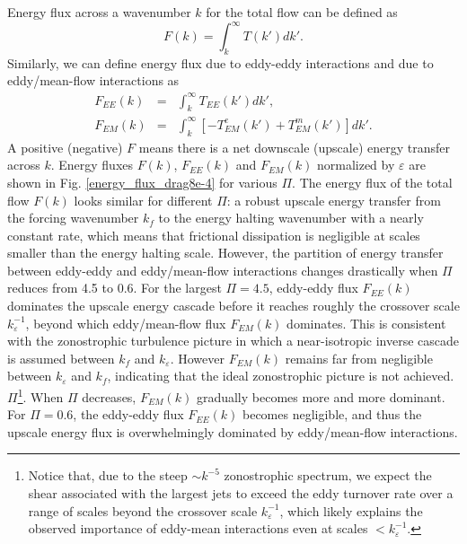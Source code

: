 \documentclass{jfm}
\begin{document}
Energy flux across a wavenumber $k$ for the total flow can be defined
as
\begin{equation}
F(k)=\int_{k}^{\infty}T(k')dk'.\label{eq:energy_flux}
\end{equation}
Similarly, we can define energy flux due to eddy-eddy interactions
and due to eddy/mean-flow interactions as
\begin{eqnarray}
F_{EE}(k) & = & \int_{k}^{\infty}T_{EE}(k')dk',\label{eq:energy_flux_EE}\\
F_{EM}(k) & = & \int_{k}^{\infty}\left[-T_{EM}^{e}(k')+T_{EM}^{m}(k')\right]dk'.\label{eq:energy_flux_EM}
\end{eqnarray}
A positive (negative) $F$ means there is a net downscale (upscale)
energy transfer across $k$. Energy fluxes $F(k)$, $F_{EE}(k)$ and
$F_{EM}(k)$ normalized by $\varepsilon$ are shown in Fig. \ref{energy_flux_drag8e-4}
for various $\Pi$. The energy flux of the total flow $F(k)$ looks
similar for different $\Pi$: a robust upscale energy transfer from
the forcing wavenumber $k_{f}$ to the energy halting wavenumber with
a nearly constant rate, which means that frictional dissipation is
negligible at scales smaller than the energy halting scale. However,
the partition of energy transfer between eddy-eddy and eddy/mean-flow
interactions changes drastically when $\Pi$ reduces from 4.5 to 0.6.
For the largest $\Pi=4.5$, eddy-eddy flux $F_{EE}(k)$ dominates
the upscale energy cascade before it reaches roughly
the crossover scale $k_{\varepsilon}^{-1}$, beyond which eddy/mean-flow
flux $F_{EM}(k)$ dominates. This is consistent with the zonostrophic turbulence
picture in which a near-isotropic inverse cascade is assumed between
$k_{f}$ and $k_{\varepsilon}$. However $F_{EM}(k)$ remains far from negligible between
$k_{\varepsilon}$ and $k_{f}$, indicating that the ideal zonostrophic picture is not achieved.
$\Pi$\footnote{Notice that, due to the steep $\sim k^{-5}$ zonostrophic spectrum,
we expect the shear associated with the largest jets to exceed the eddy turnover rate over a range of scales
beyond the crossover scale $k_{\varepsilon}^{-1}$, which likely explains the observed importance of
eddy-mean interactions even at scales $<k_{\varepsilon}^{-1}$.}.
When $\Pi$ decreases, $F_{EM}(k)$ gradually becomes more 
and more dominant. For $\Pi=0.6$, the eddy-eddy
flux $F_{EE}(k)$ becomes negligible, and thus the upscale energy
flux is overwhelmingly dominated by eddy/mean-flow interactions.
\end{document}
